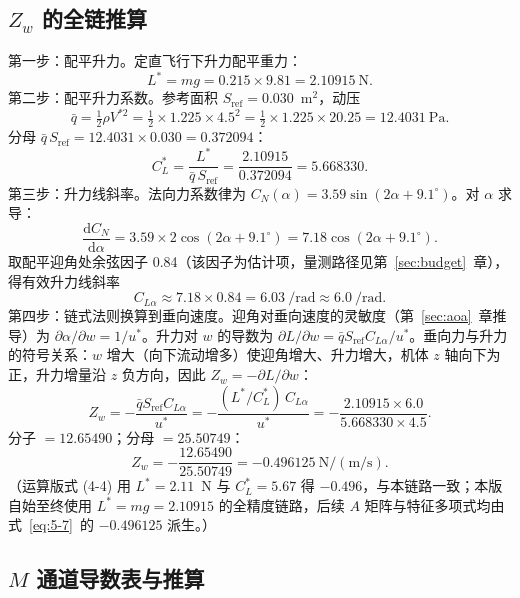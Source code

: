 \documentclass[11pt,a4paper]{ctexart}
\newcommand{\dd}{\mathrm{d}}
\begin{document}
\subsection{\texorpdfstring{$Z_w$}{Zw} 的全链推算}

第一步：配平升力。定直飞行下升力配平重力：
\begin{equation}\label{eq:5-4}
L^{*} = m g = 0.215\times 9.81 = 2.10915\ \mathrm{N}.
\tag{(5-4)}
\end{equation}
第二步：配平升力系数。参考面积 $S_{\mathrm{ref}}=0.030$~m$^2$，动压
\[
\bar q = \tfrac{1}{2}\rho V^{*2} = \tfrac{1}{2}\times 1.225\times 4.5^2 = \tfrac{1}{2}\times 1.225\times 20.25 = 12.4031\ \mathrm{Pa}.
\]
分母 $\bar q\,S_{\mathrm{ref}} = 12.4031\times 0.030 = 0.372094$：
\begin{equation}\label{eq:5-5}
C_L^{*} = \frac{L^{*}}{\bar q\,S_{\mathrm{ref}}} = \frac{2.10915}{0.372094} = 5.668330.
\tag{(5-5)}
\end{equation}
第三步：升力线斜率。法向力系数律为 $C_N(\alpha)=3.59\sin(2\alpha+9.1^{\circ})$。对 $\alpha$ 求导：
\[
\frac{\dd C_N}{\dd\alpha} = 3.59\times 2\cos(2\alpha+9.1^{\circ}) = 7.18\cos(2\alpha+9.1^{\circ}).
\]
取配平迎角处余弦因子 0.84（该因子为估计项，量测路径见第~\ref{sec:budget}~章），得有效升力线斜率
\begin{equation}\label{eq:5-6}
C_{L\alpha} \approx 7.18\times 0.84 = 6.03~/\mathrm{rad} \approx 6.0~/\mathrm{rad}.
\tag{(5-6)}
\end{equation}
第四步：链式法则换算到垂向速度。迎角对垂向速度的灵敏度（第~\ref{sec:aoa}~章推导）为 $\partial\alpha/\partial w = 1/u^{*}$。升力对 $w$ 的导数为 $\partial L/\partial w = \bar q S_{\mathrm{ref}} C_{L\alpha}/u^{*}$。垂向力与升力的符号关系：$w$ 增大（向下流动增多）使迎角增大、升力增大，机体 $z$ 轴向下为正，升力增量沿 $z$ 负方向，因此 $Z_w=-\partial L/\partial w$：
\begin{equation}\label{eq:5-7}
Z_w = -\frac{\bar q S_{\mathrm{ref}} C_{L\alpha}}{u^{*}}
= -\frac{(L^{*}/C_L^{*})\,C_{L\alpha}}{u^{*}}
= -\frac{2.10915\times 6.0}{5.668330\times 4.5}.
\tag{(5-7)}
\end{equation}
分子 $=12.65490$；分母 $=25.50749$：
\[
Z_w = -\frac{12.65490}{25.50749} = -0.496125\ \mathrm{N/(m/s)}.
\]
（运算版式 (4-4) 用 $L^{*}=2.11$~N 与 $C_L^{*}=5.67$ 得 $-0.496$，与本链路一致；本版自始至终使用 $L^{*}=mg=2.10915$ 的全精度链路，后续 $A$ 矩阵与特征多项式均由式~\eqref{eq:5-7}~的 $-0.496125$ 派生。）

\subsection{\texorpdfstring{$M$}{M} 通道导数表与推算}
\end{document}
